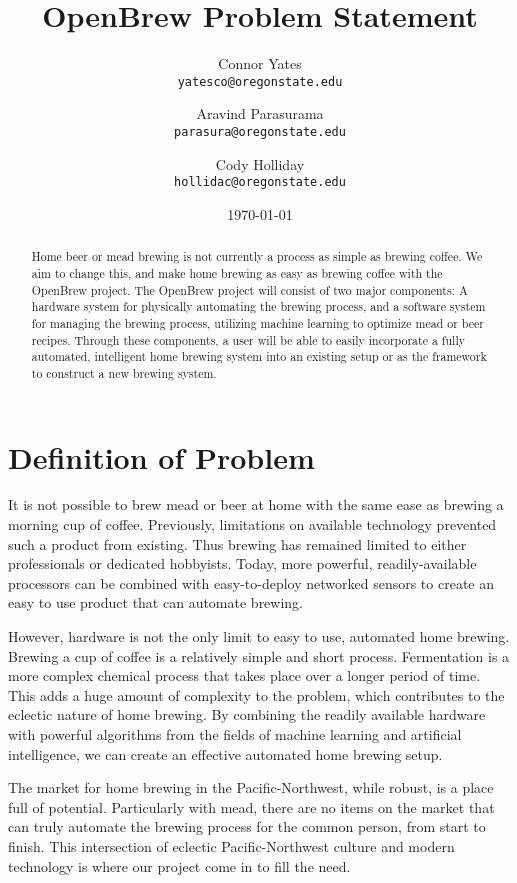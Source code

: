 \documentclass[letterpaper,10pt]{article}
\author{Connor Yates\\
\texttt{yatesco@oregonstate.edu}
\and
Aravind Parasurama\\
\texttt{parasura@oregonstate.edu}
\and
Cody Holliday\\
\texttt{hollidac@oregonstate.edu}}
\date{\today}
\title{OpenBrew Problem Statement}
\begin{document}
\maketitle

\begin{abstract}
	Home beer or mead brewing is not currently a process as simple as brewing coffee.
	We aim to change this, and make home brewing as easy as brewing coffee with the OpenBrew project.
	The OpenBrew project will consist of two major components:
	A hardware system for physically automating the brewing process, and a software system for managing the brewing process, utilizing machine learning to optimize mead or beer recipes.
	Through these components, a user will be able to easily incorporate a fully automated, intelligent home brewing system into an existing setup or as the framework to construct a new brewing system.
\end{abstract}

\newpage

\section{Definition of Problem}
It is not possible to brew mead or beer at home with the same ease as brewing a morning cup of coffee.
Previously, limitations on available technology prevented such a product from existing.
Thus brewing has remained limited to either professionals or dedicated hobbyists.
Today, more powerful, readily-available processors can be combined with easy-to-deploy networked sensors to create an easy to use product that can automate brewing.

However, hardware is not the only limit to easy to use, automated home brewing. 
Brewing a cup of coffee is a relatively simple and short process.
Fermentation is a more complex chemical process that takes place over a longer period of time.
This adds a huge amount of complexity to the problem, which contributes to the eclectic nature of home brewing.
By combining the readily available hardware with powerful algorithms from the fields of machine learning and artificial intelligence, we can create an effective automated home brewing setup.

The market for home brewing in the Pacific-Northwest, while robust, is a place full of potential.
Particularly with mead, there are no items on the market that can truly automate the brewing process for the common person, from start to finish.
This intersection of eclectic Pacific-Northwest culture and modern technology is where our project come in to fill the need.
\end{document}
